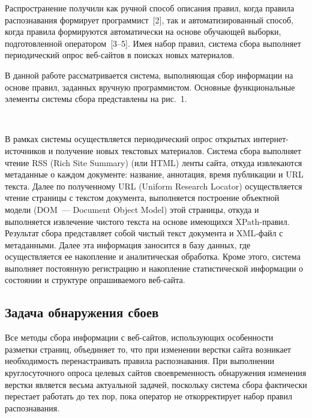 \begin{multicols}{2}
Распространение 
получили как ручной способ описания правил, когда правила распознавания 
формирует программист~[2], так и автоматизированный способ, когда правила 
формируются автоматически на основе обучающей выборки, подготовленной 
оператором~[3--5]. Имея набор правил, сис\-те\-ма сбора выполняет 
периодический опрос веб-сай\-тов в поисках новых материалов. 
  
    В данной работе рассматривается система, выполняющая сбор информации 
на основе правил, заданных вручную программистом. Основные 
функциональные элементы системы сбора представлены на рис.~1.
\begin{figure*} %
\vspace*{9pt}
 \begin{center}
 \mbox{%
 \epsfxsize=164.84mm
 }
 \end{center}
 \vspace*{-6pt}
  \end{figure*}
  
    В рамках системы осуществляется периодический опрос открытых 
  ин\-тер\-нет-ис\-точ\-ни\-ков и получение новых текстовых материалов. 
Система сбора выполняет чтение RSS (Rich Site Summary)  (или HTML) ленты сайта, откуда 
извлекаются метаданные о каждом документе: название, аннотация, время 
публикации и URL текста. Далее по полученному URL (Uniform Research Locator)
осуществляется чтение 
страницы с текстом документа, выполняется построение объектной мо\-де\-ли (DOM~---
Document Object Model) этой 
страницы, откуда и выполняется извлечение чистого текста на основе 
имеющихся XPath-пра\-вил. Результат сбора представляет собой чистый текст 
документа и XML-файл с метаданными. Далее эта информация заносится в базу 
данных, где осуществляется ее накопление и аналитическая обработка. Кроме 
этого, система выполняет постоянную регистрацию и накопление 
статистической информации о состоянии и структуре опрашиваемого 
  веб-сайта.

\subsection{Задача обнаружения сбоев}
  
    Все методы сбора информации с веб-сай\-тов, использующих особенности 
разметки страниц, объединяет то, что при изменении верстки сайта воз\-никает 
необходимость перенастраивать правила распознавания. При выполнении 
круглосуточного опроса целевых сайтов своевременность обнаружения 
изменения верстки является весьма актуальной задачей, поскольку система 
сбора фактически перестает работать до тех пор, пока оператор не 
откорректирует набор правил распознавания.
  

\end{multicols}
